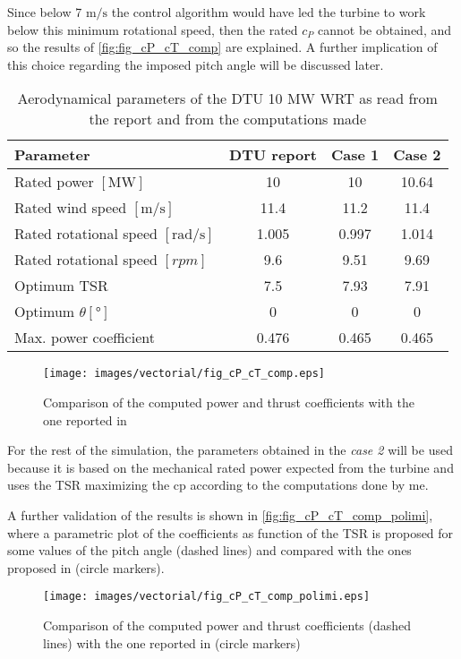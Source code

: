Since below 7 $\si{\meter\per\second}$ the control algorithm would have led the turbine to work below this minimum rotational speed, then the rated $c_P$ cannot be obtained, and so the results of \autoref{fig:fig_cP_cT_comp} are explained. A further implication of this choice regarding the imposed pitch angle will be discussed later.

\begin{table}[htb]
    \caption{Aerodynamical parameters of the DTU 10 MW \acrshort{WRT} as read from the report and from the computations made}
    \centering
    \begin{tabular}{lccc}
    \toprule
    Parameter & DTU report & Case 1 & Case 2\\ \midrule
    Rated power $\left[\si{\mega \watt}\right]$ & 10 & 10 & 10.64  \\
    Rated wind speed $\left[\si{\meter \per \second}\right]$ & 11.4 & 11.2 & 11.4 \\
    Rated rotational speed $\left[\si{\radian \per \second}\right]$ & 1.005 & 0.997 & 1.014 \\
    Rated rotational speed $\left[rpm\right]$ & 9.6 & 9.51 & 9.69\\
    Optimum \acrshort{TSR} & 7.5 & 7.93 & 7.91\\
    Optimum $\theta \left[\si{\degree}\right]$ & 0 & 0 & 0 \\
    Max. power coefficient & 0.476 & 0.465 & 0.465 \\
    \bottomrule
    \end{tabular}
    \label{tab:DTU_10_aero}
\end{table}

\begin{figure}[htb]
    \centering
    \texttt{[image: images/vectorial/fig\_cP\_cT\_comp.eps]}
    \caption{Comparison of the computed power and thrust coefficients with the one reported in \cite{DTU_Wind_Energy_Report-I-0092}}
    \label{fig:fig_cP_cT_comp}
\end{figure}
For the rest of the simulation, the parameters obtained in the \textit{case 2} will be used because it is based on the mechanical rated power expected from the turbine and uses the \acrlong{TSR} maximizing the \acrlong{cp} according to the computations done by me.

A further validation of the results is shown in \autoref{fig:fig_cP_cT_comp_polimi}, where a parametric plot of the coefficients as function of the \acrshort{TSR} is proposed for some values of the pitch angle (dashed lines) and compared with the ones proposed in  \cite{Variable-speed_Variable-pitch_control_for_a_wind_t} (circle markers).
\begin{figure}[htb]
    \centering
    \texttt{[image: images/vectorial/fig\_cP\_cT\_comp\_polimi.eps]}
    \caption{Comparison of the computed power and thrust coefficients (dashed lines) with the one reported in \cite{Variable-speed_Variable-pitch_control_for_a_wind_t} (circle markers)}
    \label{fig:fig_cP_cT_comp_polimi}
\end{figure}

